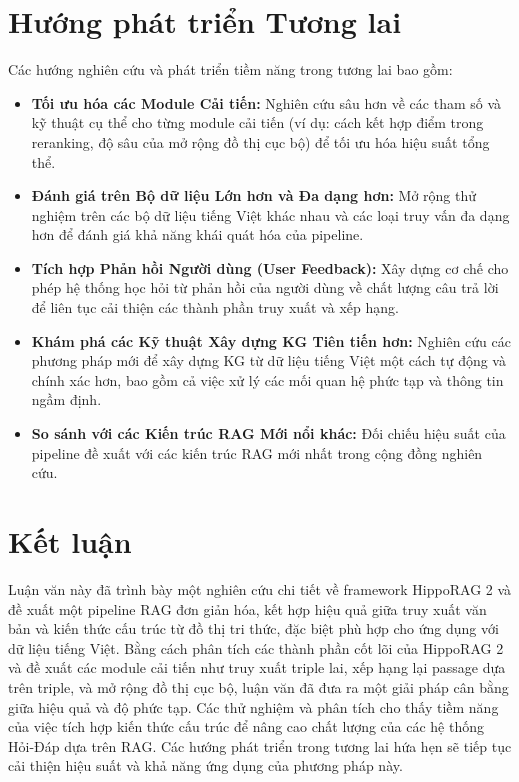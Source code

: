 \documentclass[../main.tex]{subfiles}
\begin{document}
\section{Hướng phát triển Tương lai}
Các hướng nghiên cứu và phát triển tiềm năng trong tương lai bao gồm:
\begin{itemize}
    \item \textbf{Tối ưu hóa các Module Cải tiến:} Nghiên cứu sâu hơn về các tham số và kỹ thuật cụ thể cho từng module cải tiến (ví dụ: cách kết hợp điểm trong reranking, độ sâu của mở rộng đồ thị cục bộ) để tối ưu hóa hiệu suất tổng thể.
    \item \textbf{Đánh giá trên Bộ dữ liệu Lớn hơn và Đa dạng hơn:} Mở rộng thử nghiệm trên các bộ dữ liệu tiếng Việt khác nhau và các loại truy vấn đa dạng hơn để đánh giá khả năng khái quát hóa của pipeline.
    \item \textbf{Tích hợp Phản hồi Người dùng (User Feedback):} Xây dựng cơ chế cho phép hệ thống học hỏi từ phản hồi của người dùng về chất lượng câu trả lời để liên tục cải thiện các thành phần truy xuất và xếp hạng.
    \item \textbf{Khám phá các Kỹ thuật Xây dựng KG Tiên tiến hơn:} Nghiên cứu các phương pháp mới để xây dựng KG từ dữ liệu tiếng Việt một cách tự động và chính xác hơn, bao gồm cả việc xử lý các mối quan hệ phức tạp và thông tin ngầm định.
    \item \textbf{So sánh với các Kiến trúc RAG Mới nổi khác:} Đối chiếu hiệu suất của pipeline đề xuất với các kiến trúc RAG mới nhất trong cộng đồng nghiên cứu.
\end{itemize}

\section{Kết luận}
Luận văn này đã trình bày một nghiên cứu chi tiết về framework HippoRAG 2 và đề xuất một pipeline RAG đơn giản hóa, kết hợp hiệu quả giữa truy xuất văn bản và kiến thức cấu trúc từ đồ thị tri thức, đặc biệt phù hợp cho ứng dụng với dữ liệu tiếng Việt. Bằng cách phân tích các thành phần cốt lõi của HippoRAG 2 và đề xuất các module cải tiến như truy xuất triple lai, xếp hạng lại passage dựa trên triple, và mở rộng đồ thị cục bộ, luận văn đã đưa ra một giải pháp cân bằng giữa hiệu quả và độ phức tạp. Các thử nghiệm và phân tích cho thấy tiềm năng của việc tích hợp kiến thức cấu trúc để nâng cao chất lượng của các hệ thống Hỏi-Đáp dựa trên RAG. Các hướng phát triển trong tương lai hứa hẹn sẽ tiếp tục cải thiện hiệu suất và khả năng ứng dụng của phương pháp này.
\end{document}
